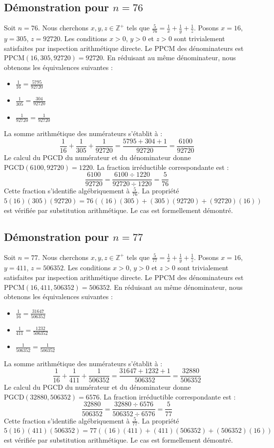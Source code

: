 \documentclass[12pt,a4paper]{article}
\begin{document}
\subsection{Démonstration pour $n = 76$}
Soit $n = 76$. Nous cherchons $x, y, z \in \mathbb{Z}^{+}$ tels que $\frac{5}{76} = \frac{1}{x} + \frac{1}{y} + \frac{1}{z}$.
Posons $x = 16$, $y = 305$, $z = 92720$.
Les conditions $x > 0$, $y > 0$ et $z > 0$ sont trivialement satisfaites par inspection arithmétique directe.
Le PPCM des dénominateurs est $\text{PPCM}(16, 305, 92720) = 92720$.
En réduisant au même dénominateur, nous obtenons les équivalences suivantes :
\begin{itemize}
    \item $\frac{1}{16} = \frac{5795}{92720}$
    \item $\frac{1}{305} = \frac{304}{92720}$
    \item $\frac{1}{92720} = \frac{1}{92720}$
\end{itemize}
La somme arithmétique des numérateurs s'établit à :
$$ \frac{1}{16} + \frac{1}{305} + \frac{1}{92720} = \frac{5795 + 304 + 1}{92720} = \frac{6100}{92720} $$
Le calcul du PGCD du numérateur et du dénominateur donne $\text{PGCD}(6100, 92720) = 1220$.
La fraction irréductible correspondante est :
$$ \frac{6100}{92720} = \frac{6100 \div 1220}{92720 \div 1220} = \frac{5}{76} $$
Cette fraction s'identifie algébriquement à $\frac{5}{76}$.
La propriété $5(16)(305)(92720) = 76((16)(305) + (305)(92720) + (92720)(16))$ est vérifiée par substitution arithmétique.
Le cas est formellement démontré.

\subsection{Démonstration pour $n = 77$}
Soit $n = 77$. Nous cherchons $x, y, z \in \mathbb{Z}^{+}$ tels que $\frac{5}{77} = \frac{1}{x} + \frac{1}{y} + \frac{1}{z}$.
Posons $x = 16$, $y = 411$, $z = 506352$.
Les conditions $x > 0$, $y > 0$ et $z > 0$ sont trivialement satisfaites par inspection arithmétique directe.
Le PPCM des dénominateurs est $\text{PPCM}(16, 411, 506352) = 506352$.
En réduisant au même dénominateur, nous obtenons les équivalences suivantes :
\begin{itemize}
    \item $\frac{1}{16} = \frac{31647}{506352}$
    \item $\frac{1}{411} = \frac{1232}{506352}$
    \item $\frac{1}{506352} = \frac{1}{506352}$
\end{itemize}
La somme arithmétique des numérateurs s'établit à :
$$ \frac{1}{16} + \frac{1}{411} + \frac{1}{506352} = \frac{31647 + 1232 + 1}{506352} = \frac{32880}{506352} $$
Le calcul du PGCD du numérateur et du dénominateur donne $\text{PGCD}(32880, 506352) = 6576$.
La fraction irréductible correspondante est :
$$ \frac{32880}{506352} = \frac{32880 \div 6576}{506352 \div 6576} = \frac{5}{77} $$
Cette fraction s'identifie algébriquement à $\frac{5}{77}$.
La propriété $5(16)(411)(506352) = 77((16)(411) + (411)(506352) + (506352)(16))$ est vérifiée par substitution arithmétique.
Le cas est formellement démontré.
\end{document}
